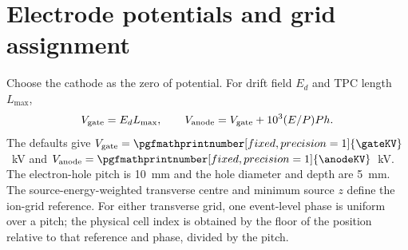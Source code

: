 \documentclass[11pt]{article}
\begin{document}
\section{Electrode potentials and grid assignment}
Choose the cathode as the zero of potential. For drift field $E_d$ and TPC
length $L_{\max}$,
\begin{equation}
 V_{\rm gate}=E_dL_{\max},\qquad
 V_{\rm anode}=V_{\rm gate}+10^3(E/P)P h.
\end{equation}
The defaults give $V_{\rm gate}=\pgfmathprintnumber[fixed,precision=1]{\gateKV}$~kV
and $V_{\rm anode}=\pgfmathprintnumber[fixed,precision=1]{\anodeKV}$~kV.
The electron-hole pitch is 10~mm and the hole diameter and depth are 5~mm.
The source-energy-weighted transverse centre and minimum source $z$ define
the ion-grid reference. For either transverse grid, one event-level phase is
uniform over a pitch; the physical cell index is obtained by the floor of
the position relative to that reference and phase, divided by the pitch.



\end{document}
